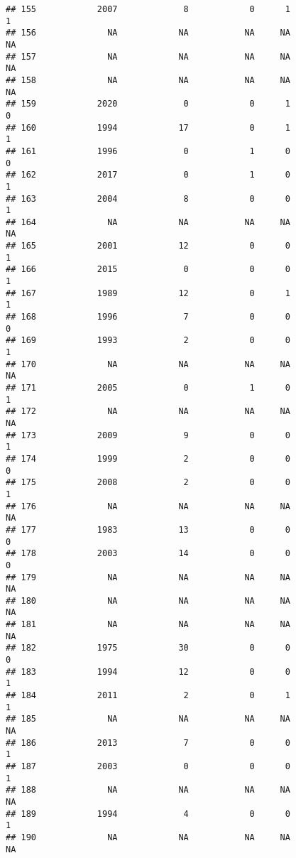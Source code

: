\documentclass[
  english,
  man]{apa6}
\begin{document}
\begin{verbatim}
## 155            2007             8            0      1               1
## 156              NA            NA           NA     NA              NA
## 157              NA            NA           NA     NA              NA
## 158              NA            NA           NA     NA              NA
## 159            2020             0            0      1               0
## 160            1994            17            0      1               1
## 161            1996             0            1      0               0
## 162            2017             0            1      0               1
## 163            2004             8            0      0               1
## 164              NA            NA           NA     NA              NA
## 165            2001            12            0      0               1
## 166            2015             0            0      0               1
## 167            1989            12            0      1               1
## 168            1996             7            0      0               0
## 169            1993             2            0      0               1
## 170              NA            NA           NA     NA              NA
## 171            2005             0            1      0               1
## 172              NA            NA           NA     NA              NA
## 173            2009             9            0      0               1
## 174            1999             2            0      0               0
## 175            2008             2            0      0               1
## 176              NA            NA           NA     NA              NA
## 177            1983            13            0      0               0
## 178            2003            14            0      0               0
## 179              NA            NA           NA     NA              NA
## 180              NA            NA           NA     NA              NA
## 181              NA            NA           NA     NA              NA
## 182            1975            30            0      0               0
## 183            1994            12            0      0               1
## 184            2011             2            0      1               1
## 185              NA            NA           NA     NA              NA
## 186            2013             7            0      0               1
## 187            2003             0            0      0               1
## 188              NA            NA           NA     NA              NA
## 189            1994             4            0      0               1
## 190              NA            NA           NA     NA              NA

\end{verbatim}
\end{document}

